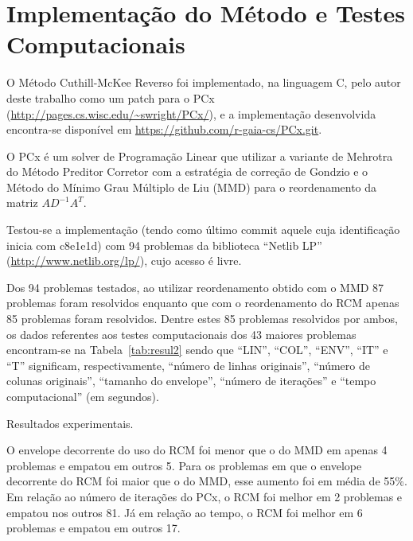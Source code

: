 \section{Implementação do Método e Testes Computacionais}
O Método Cuthill-McKee Reverso foi implementado, na linguagem C, pelo autor
deste trabalho como um patch para o PCx
(\url{http://pages.cs.wisc.edu/~swright/PCx/}), e a implementação desenvolvida
encontra-se disponível em \url{https://github.com/r-gaia-cs/PCx.git}.

O PCx é um solver de Programação Linear que utilizar a variante de Mehrotra do
Método Preditor Corretor com a estratégia de correção de Gondzio e o Método do
Mínimo Grau Múltiplo de Liu\cite{George:1981:ComputerSolutionPD} (MMD) para o
reordenamento da matriz $A D^{-1} A^T$.

Testou-se a implementação (tendo como último commit aquele cuja identificação
inicia com c8e1e1d) com 94 problemas da biblioteca ``Netlib LP''
(\url{http://www.netlib.org/lp/}), cujo acesso é livre.

Dos 94 problemas testados, ao utilizar reordenamento obtido com o MMD 87
problemas foram resolvidos enquanto que com o reordenamento do RCM apenas 85
problemas foram resolvidos. Dentre estes 85 problemas resolvidos por ambos, os
dados referentes aos testes computacionais dos 43 maiores problemas encontram-se
na Tabela~\ref{tab:resul2} sendo que ``LIN'', ``COL'', ``ENV'', ``IT'' e ``T''
significam, respectivamente, ``número de linhas originais'', ``número de colunas
originais'', ``tamanho do envelope'', ``número de iterações'' e ``tempo
computacional'' (em segundos).
\begin{table}
  \caption{Resultados experimentais.}
  \label{tab:resul2}
  
\end{table}

O envelope decorrente do uso do RCM foi menor que o do MMD em apenas 4 problemas
e empatou em outros 5. Para os problemas em que o envelope decorrente do RCM foi
maior que o do MMD, esse aumento foi em média de 55\%. Em relação ao número de
iterações do PCx, o RCM foi melhor em 2 problemas e empatou nos outros 81. Já em
relação ao tempo, o RCM foi melhor em 6 problemas e empatou em outros 17.
